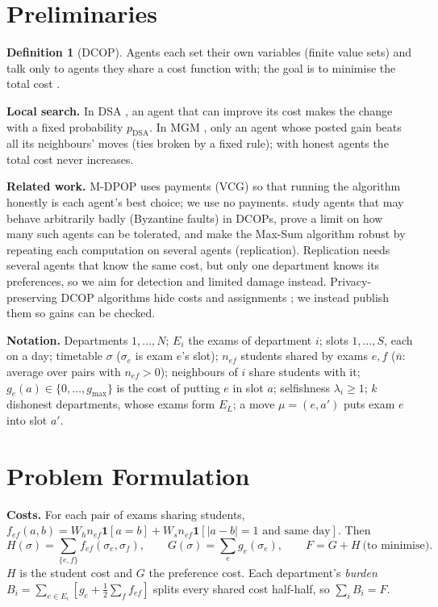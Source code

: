 \documentclass{article}
\theoremstyle{definition}
\newtheorem{definition}{Definition}
\newcommand{\1}{\mathbf{1}}
\newcommand{\gmax}{g_{\max}}
\begin{document}
\section{Preliminaries}
\label{sec:prelim}
\begin{definition}[DCOP]
Agents each set their own variables (finite value sets) and talk only to agents they share a cost function with; the goal is to minimise the total cost \citep{fioretto2018}.
\end{definition}

\textbf{Local search.} In DSA \citep{zhang2005}, an agent that can improve its cost makes the change with a fixed probability $p_{\text{DSA}}$. In MGM \citep{maheswaran2004mgm}, only an agent whose posted gain beats all its neighbours' moves (ties broken by a fixed rule); with honest agents the total cost never increases.

\textbf{Related work.} M-DPOP \citep{petcu2008mdpop} uses payments (VCG) so that running the algorithm honestly is each agent's best choice; we use no payments. \citet{noshiro2026} study agents that may behave arbitrarily badly (Byzantine faults) in DCOPs, prove a limit on how many such agents can be tolerated, and make the Max-Sum algorithm robust by repeating each computation on several agents (replication). Replication needs several agents that know the same cost, but only one department knows its preferences, so we aim for detection and limited damage instead. Privacy-preserving DCOP algorithms hide costs and assignments \citep{tassa2019,goldklang2025}; we instead publish them so gains can be checked.

\textbf{Notation.} Departments $1,\dots,N$; $E_i$ the exams of department $i$; slots $1,\dots,S$, each on a day; timetable $\sigma$ ($\sigma_e$ is exam $e$'s slot); $n_{ef}$ students shared by exams $e,f$ ($\bar n$: average over pairs with $n_{ef}>0$); neighbours of $i$ share students with it; $g_e(a)\in\{0,\dots,\gmax\}$ is the cost of putting $e$ in slot $a$; selfishness $\lambda_i\ge1$; $k$ dishonest departments, whose exams form $E_L$; a move $\mu=(e,a')$ puts exam $e$ into slot $a'$.

\section{Problem Formulation}
\label{sec:form}
\textbf{Costs.} For each pair of exams sharing students,
$f_{ef}(a,b)=W_h n_{ef}\1[a=b]+W_s n_{ef}\1[|a-b|=1 \text{ and same day}]$. Then
\begin{equation}
H(\sigma)=\textstyle\sum_{\{e,f\}}f_{ef}(\sigma_e,\sigma_f),\qquad G(\sigma)=\sum_e g_e(\sigma_e),\qquad F=G+H \ \text{(to minimise)}.
\label{eq:cost}
\end{equation}
$H$ is the student cost and $G$ the preference cost. Each department's \emph{burden} $B_i=\sum_{e\in E_i}[g_e+\frac12\sum_f f_{ef}]$ splits every shared cost half-half, so $\sum_iB_i=F$.
\end{document}

